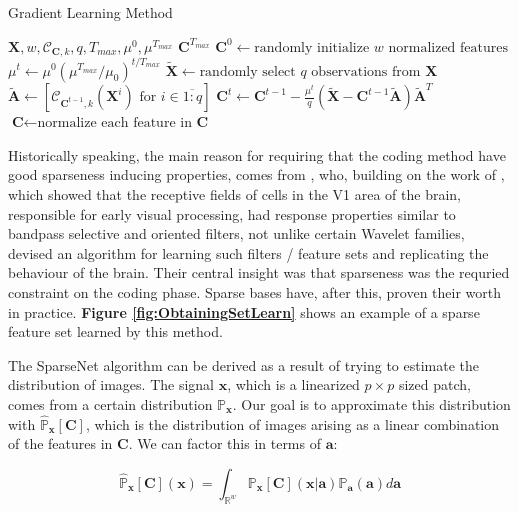 \documentclass[12pt,a4paper,oneside,english]{UPBThesis}
\newcommand{\hctimes}[2]{{#1}\!\times\!{#2}}
\newcommand{\hcrange}[2]{\overline{{#1}\colon\!\!{#2}}}
\newcommand{\hcweightspace}{\mathbb{R}^w}
\begin{document}
\begin{algorithm}
\caption{Gradient Learning Method}
\label{algo:GradSt}
\begin{algorithmic}
\Require $\textbf{X},w,\mathcal{C}_{\textbf{C},k},q,T_{max},\mu^0,\mu^{T_{max}}$
\Ensure $\textbf{C}^{T_{max}}$
\State $\textbf{C}^0 \gets \mbox{randomly initialize $w$ normalized features}$
\For {$t = \hcrange{1}{T_{max}}$}
\State $\mu^t \gets \mu^0(\mu^{T_{max}} / \mu_0)^{t / T_{max}}$ 
\State $\tilde{\textbf{X}} \gets \mbox{randomly select $q$ observations from $\textbf{X}$}$
\State $\tilde{\textbf{A}} \gets \left[ \mathcal{C}_{\textbf{C}^{t-1},k}(\textbf{X}^i) \mbox{~for $i \in \hcrange{1}{q}$} \right]$
\State $\textbf{C}^t \gets \textbf{C}^{t-1} - \frac{\mu^t}{q} \left( \tilde{\textbf{X}} - \textbf{C}^{t-1}\tilde{\textbf{A}} \right) \tilde{\textbf{A}}^T$
\State $\textbf{C} \gets \mbox{normalize each feature in $\textbf{C}$}$
\EndFor
\end{algorithmic}
\end{algorithm}

Historically speaking, the main reason for requiring that the coding method have good sparseness inducing properties, comes from \cite{emergence-sparse-coding,sparse-coding-strategy-V1}, who, building on the work of \cite{macaque-cortex}, which showed that the receptive fields of cells in the V1 area of the brain, responsible for early visual processing, had response properties similar to bandpass selective and oriented filters, not unlike certain Wavelet families, devised an algorithm for learning such filters / feature sets and replicating the behaviour of the brain. Their central insight was that sparseness was the requried constraint on the coding phase. Sparse bases have, after this, proven their worth in practice. \textbf{Figure \ref{fig:ObtainingSetLearn}} shows an example of a sparse feature set learned by this method.

The SparseNet algorithm can be derived as a result of trying to estimate the distribution of images. The signal $\textbf{x}$, which is a linearized $\hctimes{p}{p}$ sized patch, comes from a certain distribution $\mathbb{P}_\textbf{x}$. Our goal is to approximate this distribution with $\hat{\mathbb{P}}_\textbf{x}[\textbf{C}]$, which is the distribution of images arising as a linear combination of the features in $\textbf{C}$. We can factor this in terms of $\textbf{a}$:

\begin{equation*}
\hat{\mathbb{P}}_\textbf{x}[\textbf{C}](\textbf{x}) = \int_{\hcweightspace}{ \mathbb{P}_\textbf{x}[\textbf{C}](\textbf{x}\left|\right.\textbf{a}) \mathbb{P}_\textbf{a}(\textbf{a}) d\textbf{a}}
\end{equation*}
\end{document}

